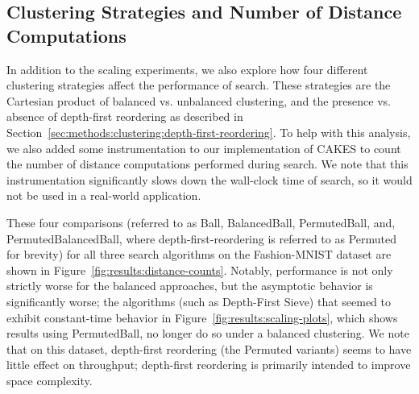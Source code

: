 \documentclass{article}
\begin{document}
\subsection{Clustering Strategies and Number of Distance Computations}
\label{sec:results:clustering-strategies-and-number-of-distance-computations}

In addition to the scaling experiments, we also explore how four different clustering strategies affect the performance of search.
These strategies are the Cartesian product of balanced vs. unbalanced clustering, and the presence vs. absence of depth-first reordering as described in Section~\ref{sec:methods:clustering:depth-first-reordering}.
To help with this analysis, we also added some instrumentation to our implementation of CAKES to count the number of distance computations performed during search.
We note that this instrumentation significantly slows down the wall-clock time of search, so it would not be used in a real-world application.

These four comparisons (referred to as Ball, BalancedBall, PermutedBall, and, PermutedBalancedBall, where depth-first-reordering is referred to as Permuted for brevity) for all three search algorithms on the Fashion-MNIST dataset are shown in Figure~\ref{fig:results:distance-counts}.
Notably, performance is not only strictly worse for the balanced approaches, but the asymptotic behavior is significantly worse;
the algorithms (such as Depth-First Sieve) that seemed to exhibit constant-time behavior in Figure~\ref{fig:results:scaling-plots}, which shows results using PermutedBall, no longer do so under a balanced clustering.
We note that on this dataset, depth-first reordering (the Permuted variants) seems to have little effect on throughput; depth-first reordering is primarily intended to improve space complexity.




\end{document}
